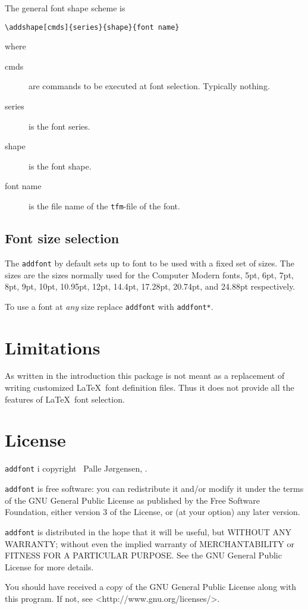 \documentclass[12pt,british,parskip=half]{scrartcl}
\begin{document}
The general font shape scheme is
\begin{lstlisting}
\addshape[cmds]{series}{shape}{font name}
\end{lstlisting}

where 
\begin{description}
\item[cmds] are commands to be executed at font selection. Typically
  nothing.
\item[series] is the font series.
\item[shape] is the font shape.
\item[font name] is the file name of the \texttt{tfm}-file of the font.
\end{description}

\subsection{Font size selection}
\label{sec:font-size-selection}

The \lstinline|addfont| by default sets up to font to be used with a
fixed set of sizes. The sizes are the sizes normally used for the
Computer Modern fonts, 5pt, 6pt, 7pt, 8pt, 9pt, 10pt, 10.95pt, 12pt,
14.4pt, 17.28pt, 20.74pt, and 24.88pt respectively.

To use a font at \emph{any} size replace \lstinline|addfont| with
\lstinline|addfont*|.

\section{Limitations}
\label{sec:limitations}

As written in the introduction this package is not meant as a
replacement of writing customized \LaTeX\ font definition files. Thus
it does not provide all the features of \LaTeX\ font selection.

\section{License}
\label{sec:license}

\texttt{addfont} i copyright \textcopyright\ Palle Jørgensen,
\the\year.

\texttt{addfont} is free software: you can redistribute it and/or
modify it under the terms of the GNU General Public License as
published by the Free Software Foundation, either version 3 of the
License, or (at your option) any later version.

\texttt{addfont} is distributed in the hope that it will be useful,
but WITHOUT ANY WARRANTY; without even the implied warranty of
MERCHANTABILITY or FITNESS FOR A PARTICULAR PURPOSE. See the GNU
General Public License for more details.

You should have received a copy of the GNU General Public License
along with this program. If not, see <http://www.gnu.org/licenses/>.
\end{document}
